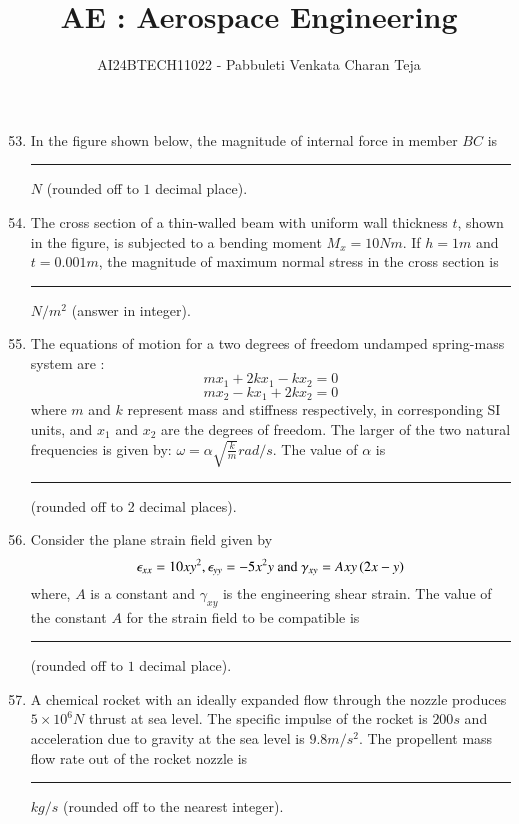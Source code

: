 \documentclass[journal]{IEEEtran}
\begin{document}

\vspace{3cm}

\title{AE : Aerospace Engineering}
\author{AI24BTECH11022 - Pabbuleti Venkata Charan Teja}
\maketitle

\renewcommand{\thefigure}{\theenumi}
\renewcommand{\thetable}{\theenumi}


\begin{enumerate}
\setcounter{enumi}{52}
\item In the figure shown below, the magnitude of internal force in member $BC$
is \rule{1cm}{0.15mm} $N$ (rounded off to $1$ decimal place).




\item The cross section of a thin-walled beam with uniform wall thickness $t$, shown in the figure, is subjected to a bending moment $M_{x}=10Nm$. If $h=1m$ and $t=0.001m$, the magnitude of maximum normal stress in the cross section is \rule{1cm}{0.15mm} $N/m^{2}$ (answer in integer).



\item The equations of motion for a two degrees of freedom undamped spring-mass system are : $$mx_{1}+2kx_{1}-kx_{2}=0$$ $$mx_{2}-kx_{1}+2kx_{2}=0$$ where $m$ and $k$ represent mass and stiffness respectively, in corresponding SI units, and $x_{1}$ and $x_{2}$ are the degrees of freedom. The larger of the two natural frequencies is given by: $\omega=\alpha\sqrt{\frac{k}{m}}rad/s$. The value of $\alpha$ is \rule{1cm}{0.15mm} (rounded off to 2 decimal places).


\item Consider the plane strain field given by $$\epsilon_{xx}=10xy^{2},\epsilon_{yy}=-5x^{2}y\text{ and }\gamma_{xy}=Axy\left(2x-y\right)$$ where, $A$ is a constant and $\gamma_{xy}$ is the engineering shear strain. The value of the constant $A$ for the strain field to be compatible is \rule{1cm}{0.15mm} (rounded off to $1$ decimal place).


\item A chemical rocket with an ideally expanded flow through the nozzle produces $5\times 10^{6}N$ thrust at sea level. The specific impulse of the rocket is $200s$ and acceleration due to gravity at the sea level is $9.8m/s^{2}$. The propellent mass flow rate out of the rocket nozzle is \rule{1cm}{0.15mm} $kg/s$ (rounded off to the nearest integer).



\end{enumerate}
\end{document}
